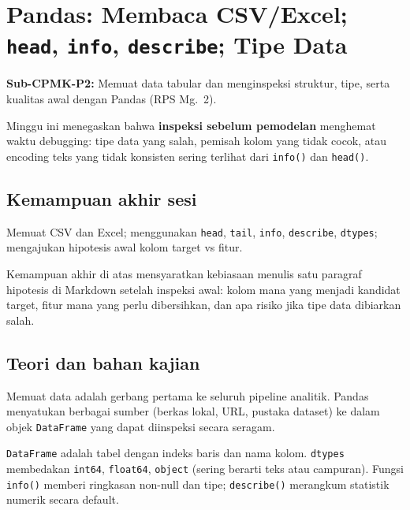 \documentclass[../main.tex]{subfiles}
\begin{document}
\chapter{Pandas: Membaca CSV/Excel; \texttt{head}, \texttt{info}, \texttt{describe}; Tipe Data}

\begin{subcpmk}
  \item \textbf{Sub-CPMK-P2:} Memuat data tabular dan menginspeksi struktur, tipe, serta kualitas awal dengan Pandas (RPS Mg.\ 2).
\end{subcpmk}


\noindent Minggu ini menegaskan bahwa \textbf{inspeksi sebelum pemodelan} menghemat waktu debugging: tipe data yang salah, pemisah kolom yang tidak cocok, atau encoding teks yang tidak konsisten sering terlihat dari \texttt{info()} dan \texttt{head()}.

\section{Kemampuan akhir sesi}

Memuat CSV dan Excel; menggunakan \texttt{head}, \texttt{tail}, \texttt{info}, \texttt{describe}, \texttt{dtypes}; mengajukan hipotesis awal kolom target vs fitur.

Kemampuan akhir di atas mensyaratkan kebiasaan menulis satu paragraf hipotesis di Markdown setelah inspeksi awal: kolom mana yang menjadi kandidat target, fitur mana yang perlu dibersihkan, dan apa risiko jika tipe data dibiarkan salah.

\section{Teori dan bahan kajian}

Memuat data adalah gerbang pertama ke seluruh pipeline analitik. Pandas menyatukan berbagai sumber (berkas lokal, URL, pustaka dataset) ke dalam objek \texttt{DataFrame} yang dapat diinspeksi secara seragam.

\begin{konsep}
\texttt{DataFrame} adalah tabel dengan indeks baris dan nama kolom. \texttt{dtypes} membedakan \texttt{int64}, \texttt{float64}, \texttt{object} (sering berarti teks atau campuran). Fungsi \texttt{info()} memberi ringkasan non-null dan tipe; \texttt{describe()} merangkum statistik numerik secara default.
\end{konsep}
\end{document}
